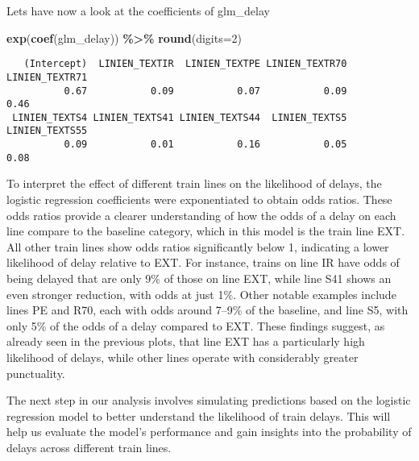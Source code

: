 \documentclass[
]{article}
\newenvironment{Shaded}{\begin{snugshade}}{\end{snugshade}}
\newcommand{\AttributeTok}[1]{\textcolor[rgb]{0.13,0.29,0.53}{#1}}
\newcommand{\DecValTok}[1]{\textcolor[rgb]{0.00,0.00,0.81}{#1}}
\newcommand{\FunctionTok}[1]{\textcolor[rgb]{0.13,0.29,0.53}{\textbf{#1}}}
\newcommand{\NormalTok}[1]{#1}
\newcommand{\SpecialCharTok}[1]{\textcolor[rgb]{0.81,0.36,0.00}{\textbf{#1}}}
\begin{document}
Lets have now a look at the coefficients of glm\_delay

\begin{Shaded}
\begin{Highlighting}[]
\FunctionTok{exp}\NormalTok{(}\FunctionTok{coef}\NormalTok{(glm\_delay)) }\SpecialCharTok{\%\textgreater{}\%} \FunctionTok{round}\NormalTok{(}\AttributeTok{digits=}\DecValTok{2}\NormalTok{)}
\end{Highlighting}
\end{Shaded}

\begin{verbatim}
   (Intercept)  LINIEN_TEXTIR  LINIEN_TEXTPE LINIEN_TEXTR70 LINIEN_TEXTR71 
          0.67           0.09           0.07           0.09           0.46 
 LINIEN_TEXTS4 LINIEN_TEXTS41 LINIEN_TEXTS44  LINIEN_TEXTS5 LINIEN_TEXTS55 
          0.09           0.01           0.16           0.05           0.08 
\end{verbatim}

To interpret the effect of different train lines on the likelihood of
delays, the logistic regression coefficients were exponentiated to
obtain odds ratios. These odds ratios provide a clearer understanding of
how the odds of a delay on each line compare to the baseline category,
which in this model is the train line EXT. All other train lines show
odds ratios significantly below 1, indicating a lower likelihood of
delay relative to EXT. For instance, trains on line IR have odds of
being delayed that are only 9\% of those on line EXT, while line S41
shows an even stronger reduction, with odds at just 1\%. Other notable
examples include lines PE and R70, each with odds around 7--9\% of the
baseline, and line S5, with only 5\% of the odds of a delay compared to
EXT. These findings suggest, as already seen in the previous plots, that
line EXT has a particularly high likelihood of delays, while other lines
operate with considerably greater punctuality.

The next step in our analysis involves simulating predictions based on
the logistic regression model to better understand the likelihood of
train delays. This will help us evaluate the model's performance and
gain insights into the probability of delays across different train
lines.
\end{document}
